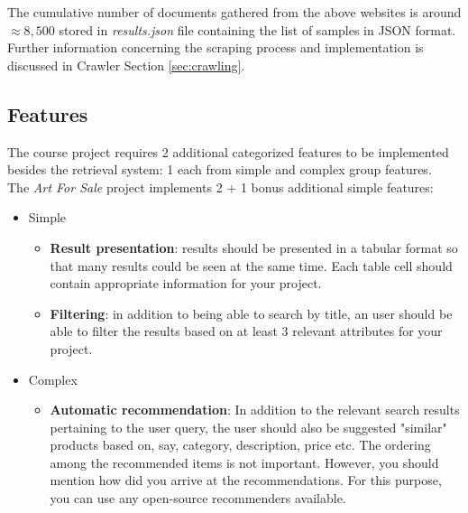\documentclass[12pt]{spieman}  %
\begin{document}
\begin{spacing}{1}
    The cumulative number of documents gathered from the above websites is around $\approx 8,500$ stored in
    \textit{results.json} file containing the list of samples in JSON format.
    Further information concerning the scraping process and implementation is discussed
    in Crawler Section \ref{sec:crawling}.

    \subsection{Features}
    The course project requires 2 additional categorized features to be implemented besides
    the retrieval system:
    1 each from simple and complex group features.\\
    The \textit{Art For Sale} project implements 2 + 1 bonus additional simple features:

    \begin{itemize}
        \item Simple
              \begin{itemize}
                  \item \textbf{Result presentation}:
                        results should be presented in a tabular format so that many results could be
                        seen at the same time.
                        Each table cell should contain appropriate information for your project.
                  \item \textbf{Filtering}:
                        in addition to being able to search by title, an user should be able to filter the
                        results based on at least 3 relevant attributes for your project.
              \end{itemize}
        \item Complex
              \begin{itemize}
                  \item \textbf{Automatic recommendation}:
                        In addition to the relevant search results pertaining to the user query,
                        the user should also be suggested "similar" products based on, say,
                        category, description, price etc.
                        The ordering among the recommended items is not important.
                        However, you should mention how did you arrive at the recommendations.
                        For this purpose, you can use any open-source recommenders available.
              \end{itemize}
    \end{itemize}


\end{spacing}
\end{document}
